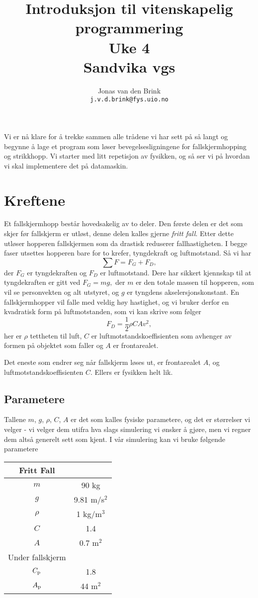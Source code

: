 \documentclass[a4paper, 11pt, notitlepage, english]{article}
\author{Jonas van den Brink \\ \texttt{j.v.d.brink@fys.uio.no}}
\title{Introduksjon til vitenskapelig programmering \\ Uke 4 \\ Sandvika vgs}
\begin{document}
\maketitle

Vi er nå klare for å trekke sammen alle trådene vi har sett på så langt og begynne å lage et program som løser bevegelsesligningene for fallskjermhopping og strikkhopp. Vi starter med litt repetisjon av fysikken, og så ser vi på hvordan vi skal implementere det på datamaskin.


\section*{Kreftene}


Et fallskjermhopp består hovedsakelig av to deler. Den første delen er det som skjer før fallskjerm er utløst, denne delen kalles gjerne \emph{fritt fall}. Etter dette utløser hopperen fallskjermen som da drastisk reduserer fallhastigheten. I begge faser utsettes hopperen bare for to krefer, tyngdekraft og luftmotstand. Så vi har
$$\sum F = F_G + F_D,$$
der $F_G$ er tyngdekraften og $F_D$ er luftmotstand. Dere har sikkert kjennskap til at tyngdekraften er gitt ved
$F_G = mg,$
der $m$ er den totale massen til hopperen, som vil se personvekten og alt utstyret, og $g$ er tyngdens akselersjonskonstant.  En fallskjermhopper vil falle med veldig høy hastighet, og vi bruker derfor en kvadratisk form på luftmotstanden, som vi kan skrive som følger
$$F_D = \frac{1}{2}\rho C A v^2,$$
her er $\rho$ tettheten til luft, $C$ er luftmotstandskoeffisienten som avhenger av formen på objektet som faller og $A$ er frontarealet.

Det eneste som endrer seg når fallskjerm løses ut, er frontarealet $A$, og luftmotstandskoeffisienten $C$. Ellers er fysikken helt lik.

\subsection*{Parametere}
Tallene $m$, $g$, $\rho$, $C$, $A$ er det som kalles fysiske parametere, og det er størrelser vi velger - vi velger dem utifra hva slags simulering vi ønsker å gjøre, men vi regner dem altså generelt sett som kjent. I vår simulering kan vi bruke følgende parametere
\begin{center}
\begin{tabular}{c|c}
Fritt Fall \\ \hline
$m$ & 90 kg \\ \hline
$g$ & 9.81 m/s$^2$ \\ \hline
$\rho$ & 1 kg/m$^3$\\ \hline
$C$ & 1.4 \\ \hline
$A$ & 0.7 m$^2$\\ \hline \hline
Under fallskjerm \\ \hline
$C_{\rm p}$ & 1.8 \\ \hline
$A_{\rm p}$ & 44 m$^2$
\end{tabular}
\end{center}
\end{document}
